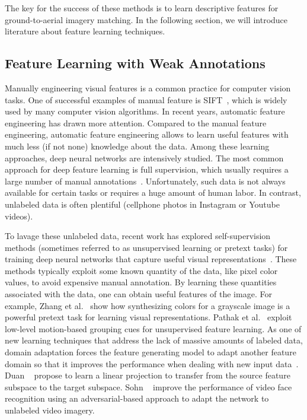 The key for the success of these methods is to learn descriptive
features for ground-to-aerial imagery matching. In the following
section, we will introduce literature about feature learning techniques.

\subsection{Feature Learning with Weak Annotations}

Manually engineering visual features is a common practice for
computer vision tasks. One of successful examples of manual
feature is SIFT~\cite{lowe1999object}, which is widely used by many
computer vision algorithms.
In recent years, automatic feature engineering has drawn more
attention. Compared to the manual feature
engineering, automatic feature engineering allows to learn
useful features with much less (if not none) knowledge about the data.
Among these learning approaches, deep neural networks are intensively
studied.  The most common approach for deep feature learning is full
supervision, which usually requires a large number of manual
annotations~\cite{yosinski2014transferable,zhou2016learning,wen2016discriminative}.
Unfortunately, such data is not always available for certain tasks or
requires a huge amount of human labor. 
In contrast, unlabeled data is often plentiful (\ie cellphone photos in Instagram
or Youtube videos).

To lavage these unlabeled data, recent work has explored
self-supervision methods (sometimes referred to as unsupervised learning or
pretext tasks) for training deep neural networks that capture useful
visual representations~\cite{doersch2015unsupervised,pathak2016context}. 
These methods typically
exploit some known quantity of the data, like pixel color values, to
avoid expensive manual annotation.
By learning these quantities associated with the data, one
can obtain useful features of the image.
For example, Zhang et al.~\cite{zhang2016colorful} show how
synthesizing colors for a grayscale image is a powerful
pretext task for learning visual representations. Pathak et
al.~\cite{pathak2017learning} exploit low-level motion-based grouping
cues for unsupervised feature learning.  
%
As one of new learning techniques that address the lack of massive amounts
of labeled data, domain adaptation forces the feature generating model
to adapt another feature domain so that it improves the performance
when dealing with new input
data~\cite{fernando2013unsupervised,fernando2015joint,saenko2010adapting,wang2016actions,tinghui2016flow}.
Duan \etal~\cite{duan2012learning} propose to learn a linear
projection to transfer from the source feature subspace to the target
subspace. Sohn \etal~\cite{sohn2017unsupervised} improve the
performance of video face recognition using an adversarial-based
approach to adapt the network to unlabeled video imagery.

